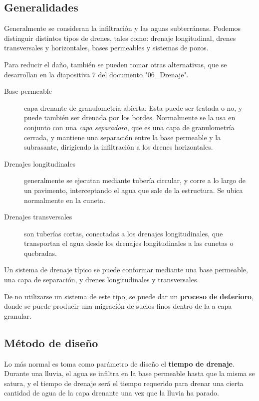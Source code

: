 \documentclass[../main.tex]{subfiles}
\begin{document}
\subsection{Generalidades}

Generalmente se consideran la infiltración y las aguas subterráneas. 
Podemos distinguir distintos tipos de drenes, tales como: drenaje longitudinal,
drenes transversales y horizontales, bases permeables y sistemas de pozos.

Para reducir el daño, también se pueden tomar otras alternativas, que se 
desarrollan en la diapositiva 7 del documento "06\_Drenaje".

\begin{description}
  \item[Base permeable] capa drenante de granulometría abierta. Esta puede
    ser tratada o no, y puede también ser drenada por los bordes.
    Normalmente se la usa en conjunto con una \textit{capa separadora}, que
    es una capa de granulometría cerrada, y mantiene una separación entre
    la base permeable y la subrasante, dirigiendo la infiltración a los
    drenes horizontales.
  \item[Drenajes longitudinales] generalmente se ejecutan mediante tubería 
    circular, y corre a lo largo de un pavimento, interceptando el agua
    que sale de la estructura. Se ubica normalmente en la cuneta.
  \item[Drenajes transversales] son tuberías cortas, conectadas a los drenajes
    longitudinales, que transportan el agua desde los drenajes longitudinales a
    las cunetas o quebradas.
\end{description}

Un sistema de drenaje típico se puede conformar mediante una base permeable,
una capa de separación, y drenes longitudinales y transversales.

De no utilizarse un sistema de este tipo, se puede dar un \textbf{proceso de}
\textbf{deterioro}, donde se puede producir una migración de suelos finos dentro de la
a capa granular.


\subsection{Método de diseño}

Lo más normal es toma como parámetro de diseño el \textbf{tiempo de drenaje}.
Durante una lluvia, el agua se infiltra en la base permeable hasta que la misma
se satura, y el tiempo de drenaje será el tiempo requerido para drenar una 
cierta cantidad de agua de la capa drenante una vez que la lluvia ha parado.
\end{document}
